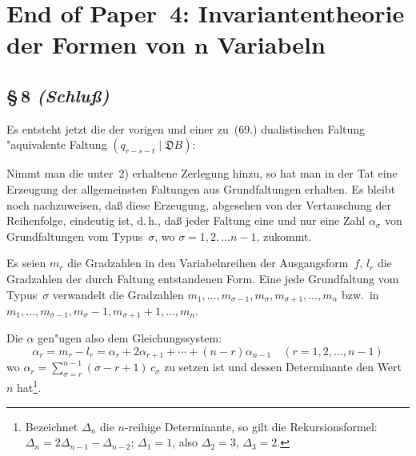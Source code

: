 \documentclass[11pt,a4paper]{article}
\begin{document}
\renewenvironment{noetherpaper}[4]{\newpage\section*{#1}\addcontentsline{toc}{section}{#1}\par\smallskip}{\par\medskip}



\section*{End of Paper~4: \foreignlanguage{ngerman}{Invariantentheorie der Formen von $\boldsymbol{n}$ Variabeln}}

\subsection*{\S\,8 \emph{(Schlu\ss)}}

Es entsteht jetzt die der vorigen und einer zu~(69.) dualistischen Faltung
"{a}quivalente Faltung $(q_{r-s-t}\mid\mathfrak{D}B)$:

Nimmt man die unter~2) erhaltene Zerlegung hinzu, so hat man
in der Tat eine Erzeugung der allgemeinsten Faltungen aus Grundfaltungen
erhalten. Es bleibt noch nachzuweisen, da\ss{} diese Erzeugung, abgesehen
von der Vertauschung der Reihenfolge, eindeutig ist, d.\,h., da\ss{} jeder
Faltung eine und nur eine Zahl $\alpha_{\sigma}$ von Grundfaltungen vom Typus~$\sigma$,
wo $\sigma=1,2,\dots n-1$, zukommt.

Es seien $m_{r}$ die Gradzahlen in den Variabelnreihen der Ausgangsform~$f$, $l_{r}$ die Gradzahlen der durch Faltung entstandenen Form. Eine jede Grundfaltung vom Typus~$\sigma$ verwandelt die Gradzahlen
$m_{1},\dots,m_{\sigma-1},m_{\sigma},m_{\sigma+1},\dots,m_{n}$
bzw.\ in $m_{1},\dots,m_{\sigma-1},m_{\sigma}-1,m_{\sigma+1}+1,\dots,m_{n}$.

Die $\alpha$ gen"{u}gen also dem Gleichungssystem:
\begin{equation}
\alpha_{r}=m_{r}-l_{r}=\alpha_{r}+2\alpha_{r+1}+\cdots+(n-r)\alpha_{n-1}
\quad(r=1,2,\dots,n-1)
\tag{70.}
\end{equation}
wo $\alpha_{r}=\sum_{\sigma=r}^{n-1}(\sigma-r+1)\,c_{\sigma}$ zu setzen ist und dessen Determinante den Wert~$n$ hat\footnote{Bezeichnet $\Delta_{n}$ die $n$-reihige Determinante, so gilt die Rekursionsformel: $\Delta_{n}=2\Delta_{n-1}-\Delta_{n-2}$; $\Delta_{1}=1$, also $\Delta_{2}=3$, $\Delta_{3}=2$.}.
\end{document}
